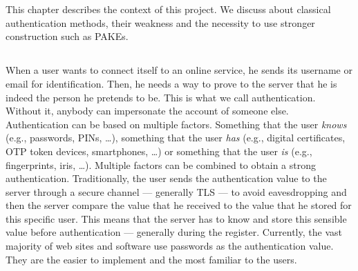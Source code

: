 ﻿\documentclass[../report.tex]{subfiles}
\begin{document}


\chapter{}
This chapter describes the context of this project. We discuss about classical authentication methods, their weakness and the necessity to use stronger construction such as PAKEs.



\section{}


\paragraph{}
When a user wants to connect itself to an online service, he sends its username or email for identification. Then, he needs a way to prove to the server that he is indeed the person he pretends to be. This is what we call authentication. Without it, anybody can impersonate the account of someone else.
Authentication can be based on multiple factors. Something that the user \emph{knows} (e.g., passwords, PINs, …), something that the user \emph{has} (e.g., digital certificates, OTP token devices, smartphones, …) or something that the user \emph{is} (e.g., fingerprints, iris, …). Multiple factors can be combined to obtain a strong authentication.
Traditionally, the user sends the authentication value to the server through a secure channel --- generally TLS --- to avoid eavesdropping and then the server compare the value that he received to the value that he stored for this specific user.
This means that the server has to know and store this sensible value before authentication --- generally during the register.
Currently, the vast majority of web sites and software use passwords as the authentication value. They are the easier to implement and the most familiar to the users.
\end{document}
